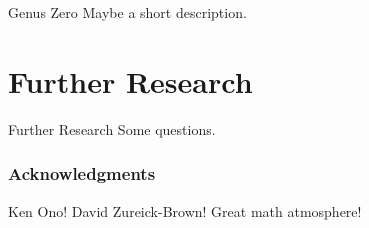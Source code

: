 \documentclass{beamer}
\theoremstyle{remark}
\begin{document}
\begin{frame}{Genus Zero}
Maybe a short description.

\end{frame}

\section{Further Research} 

\begin{frame}{Further Research}
Some questions.

\end{frame}


\begin{frame}
\frametitle{Acknowledgments}
Ken Ono!
David Zureick-Brown!
Great math atmosphere!

\end{frame}
\end{document}
